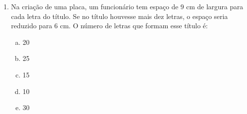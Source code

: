 \documentclass[a4paper,14pt]{article}
\begin{document}
\begin{multicols}{2}
\begin{enumerate}
        Resposta: alternativa c)
        
        Se A = 16,00 e B = 10,00 e 15(A, B) = R\$ 192,00 \\
        Solução: Se comprou 15 de ambos, então: A + B = 15 \\
        Se a soma dos gastos foi 192,00, então: 16A + 10B = 192 \\
        Portanto temos 2 equações \\
        $\begin{cases}
        	A + B = 15 \cdot (-10) \\
        	16A + 10B = 192 \\
        \end{cases}$\\
        Pelo método da soma, multiplica-se a 1ª equação por -10. \\
        $\begin{cases}
        	-10A~\cancel{- 10B} = 150 \\
        	~~16A~\cancel{+ 10B} = 192 \\
        \end{cases}$ \\
        $
        \underline{\hspace{5cm}} \\
        $ \\
        $\cdot~~~~~6A + 0B = 42$ \\
        $\cdot~~~~~6A = 42$ \\
        $\cdot~~~~~A = 7$ \\
        \\
        Se $A + B = 15$\\
        $7 + B = 15$ \\
        $B = 15 - 7$ \\
        $B = 8$ \\
        
        \newpage
    
        \item Na criação de uma placa, um funcionário tem espaço de 9 cm de largura para cada letra do título. Se no título houvesse mais dez letras, o espaço seria reduzido para 6 cm. O número de letras que formam esse título é:
        \begin{enumerate}[a)]
        	\item 20
        	\item 25
        	\item 15
        	\item 10
        	\item 30
        \end{enumerate}
    

\end{enumerate}
\end{multicols}
\end{document}
